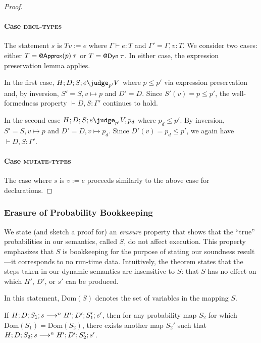 {\begin{proof}
\paragraph{Case \textsc{decl-types}}
    The statement $s$ is $T v := e$
    where $\Gamma \vdash e : T$
    and $\Gamma' = \Gamma, v : T$.
    We consider two cases: either $T = \text{\normalfont{\sffamily\small{@Approx}}}(p) \> \tau$
    or $T = \text{\normalfont{\sffamily\small{@Dyn}}} \> \tau$.
    In either case, the expression preservation lemma applies.

    In the first case,
    $H ; D ; S ; e \pjudge{p'} V$ where $p \le p'$ via expression preservation
    and, by inversion,
    $S' = S, v \mapsto p$ and $D' = D$.
    Since $S'(v) = p \le p'$,
    the well-formedness property $\vdash D, S : \Gamma'$ continues to hold.

    In the second case
    $H ; D ; S ; e \pjudge{p'} V, p_d$ where $p_d \le p'$.
    By inversion,
    $S' = S, v \mapsto p$ and $D' = D, v \mapsto p_d$.
    Since $D'(v) = p_d \le p'$,
    we again have $\vdash D, S : \Gamma'$.

\paragraph{Case \textsc{mutate-types}}
    The case where $s$ is $v := e$ proceeds similarly to the above case for
    declarations.
\end{proof}


\subsubsection{Erasure of Probability Bookkeeping}

We state (and sketch a proof for) an \emph{erasure} property that
shows that the ``true'' probabilities in our semantics, called $S$, do not
affect execution.
This property emphasizes that $S$ is bookkeeping for the purpose of stating
our soundness result---it corresponds to no run-time data.
Intuitively, the theorem states that the steps taken in our dynamic semantics
are insensitive to $S$: that $S$ has no effect on which $H'$, $D'$, or $s'$
can be produced.

In this statement, $\mathrm{Dom}(S)$ denotes the set of variables in the mapping
$S$.

\begin{theorem}
If
$H ; D ; S_1 ; s
\longrightarrow^n
H' ; D' ; S_1' ; s'$,
then for any probability map $S_2$
for which $\mathrm{Dom}(S_1) = \mathrm{Dom}(S_2)$,
there exists another map $S_2'$ such that
$H ; D ; S_2 ; s
\longrightarrow^n
H' ; D' ; S_2' ; s'$.
\end{theorem}

}
